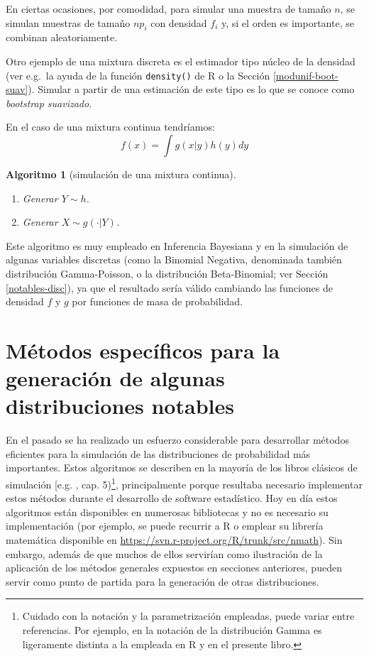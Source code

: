 \documentclass[
  10pt,
]{book}
\theoremstyle{break}
\newtheorem{conjecture}{Algoritmo}[chapter]
\theoremstyle{nonumberplain}
\let\oldfootnote\footnote
\renewcommand\footnote[1]{\oldfootnote{\hspace{2mm}#1}}
\begin{document}
En ciertas ocasiones, por comodidad, para simular una muestra de tamaño \(n\), se simulan muestras de tamaño \(np_{i}\) con densidad \(f_{i}\) y, si el orden es importante, se combinan aleatoriamente.

Otro ejemplo de una mixtura discreta es el estimador tipo núcleo de la densidad (ver e.g.~la ayuda de la función \texttt{density()} de R o la Sección \ref{modunif-boot-suav}).
Simular a partir de una estimación de este tipo es lo que se conoce como \emph{bootstrap suavizado}.

En el caso de una mixtura continua tendríamos:
\[f(x)=\int g(x|y)h(y)dy\]

\begin{conjecture}[simulación de una mixtura continua]
\protect\hypertarget{cnj:mixtura-continua}{}\label{cnj:mixtura-continua}

\begin{enumerate}
\def\labelenumi{\arabic{enumi}.}
\item
  Generar \(Y\sim h\).
\item
  Generar \(X\sim g(\cdot |Y)\).
\end{enumerate}

\end{conjecture}

Este algoritmo es muy empleado en Inferencia Bayesiana y en la simulación de algunas variables discretas (como la Binomial Negativa, denominada también distribución Gamma-Poisson, o la distribución Beta-Binomial; ver Sección \ref{notables-disc}),
ya que el resultado sería válido cambiando las funciones de densidad \(f\) y \(g\) por funciones de masa de probabilidad.

\hypertarget{notables-cont}{%
\section{Métodos específicos para la generación de algunas distribuciones notables}\label{notables-cont}}

En el pasado se ha realizado un esfuerzo considerable para desarrollar métodos eficientes para la simulación de las distribuciones de probabilidad más importantes.
Estos algoritmos se describen en la mayoría de los libros clásicos de simulación {[}e.g. \citet{cao2002}, cap. 5)\footnote{Cuidado con la notación y la parametrización empleadas, puede variar entre referencias.
  Por ejemplo, en \citet{cao2002} la notación de la distribución Gamma es ligeramente distinta a la empleada en R y en el presente libro.}, principalmente porque resultaba necesario implementar estos métodos durante el desarrollo de software estadístico.
Hoy en día estos algoritmos están disponibles en numerosas bibliotecas y no es necesario su implementación (por ejemplo, se puede recurrir a R o emplear su librería matemática disponible en \url{https://svn.r-project.org/R/trunk/src/nmath}).
Sin embargo, además de que muchos de ellos servirían como ilustración de la aplicación de los métodos generales expuestos en secciones anteriores, pueden servir como punto de partida para la generación de otras distribuciones.
\end{document}
